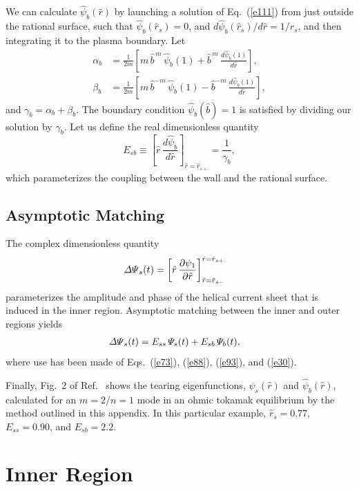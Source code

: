 \documentclass[12pt,prb,aps]{revtex4-1}
\begin{document}
We can calculate  $\hat{\psi}_b(\hat{r})$ by launching a solution of Eq.~(\ref{e111}) from just outside the
rational surface, such that 
$\hat{\psi}_b(\hat{r}_s) = 0$, and
$d\hat{\psi}_b(\hat{r}_s)/d\hat{r} = 1/\hat{r}_s$,
and then integrating it to  the plasma boundary. 
Let
\begin{align}
\alpha_b &= \frac{1}{2m}\left[m\,\hat{b}^{\,m}\,\hat{\psi}_b(1)+ \hat{b}^{\,m}  \,\frac{d\hat{\psi}_b(1)}{d\hat{r}}\right],\\[0.5ex]
\beta_b &= \frac{1}{2m}\left[m\,\hat{b}^{-m}\,\hat{\psi}_b(1)- \hat{b}^{-m}\,\frac{d\hat{\psi}_b(1)}{d\hat{r}}\right],
\end{align}
and
$\gamma_b= \alpha_b+\beta_b$.
The boundary condition $\hat{\psi}_b(\hat{b})=1$ is satisfied by dividing our solution by $\gamma_b$. 
Let us define the real dimensionless quantity 
\begin{equation}\label{e93}
E_{sb} \equiv \left[\hat{r}\,\frac{d\hat{\psi}_b}{d\hat{r}}\right]_{\hat{r}=\hat{r}_{s+}} = \frac{1}{\gamma_b},
\end{equation}
which parameterizes the coupling between the wall and the rational surface.\cite{spk,ric3}

\subsection{Asymptotic Matching}
The complex dimensionless quantity 
\begin{align}\label{e30}
{\mit\Delta\Psi}_{s}(t) &= \left[\hat{r}\,\frac{\partial\psi_1}{\partial\hat{r}}\right]_{\hat{r}=\hat{r}_{s-}}^{\hat{r}=\hat{r}_{s+}}
\end{align}
parameterizes the amplitude and phase of the helical current sheet that is induced in the inner region. 
Asymptotic matching between the inner and outer regions yields\,\cite{spk,ric3}
\begin{align}\label{e31a}
{\mit\Delta\Psi}_{s}(t) &= E_{ss}\,{\mit\Psi}_s(t)+E_{sb}\,{\mit\Psi}_b(t),
\end{align}
where use has been made of Eqs.~(\ref{e73}), (\ref{e88}), (\ref{e93}), and (\ref{e30}). 

Finally, Fig.~2 of Ref.~ shows the tearing eigenfunctions, $\hat{\psi}_s(\hat{r})$ and $\hat{\psi}_b(\hat{r})$, calculated for
an $m=2/n=1$ mode in an ohmic tokamak equilibrium by the method outlined in this appendix. In this particular example, $\hat{r}_s=0.77$,  $E_{ss}= 0.90$, and $E_{sb} = 2.2$.  

\section{Inner Region}\label{inner}
\end{document}

